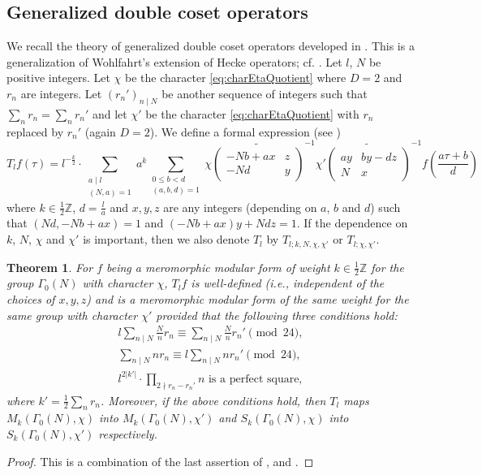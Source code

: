 \documentclass[12pt]{amsart}
\numberwithin{equation}{section}
\theoremstyle{plain}
\newtheorem{thm}{Theorem}[section]
\theoremstyle{definition}
\theoremstyle{remark}
\newcommand\twoscript[2]{\substack{{#1} \\ {#2}}}
\newcommand\tbtmat[4]{\left(\begin{smallmatrix}{#1} & {#2} \\ {#3} & {#4}\end{smallmatrix}\right)}
\newcommand*\abs[1]{\lvert#1\rvert}
\newcommand\numZ{\mathbb{Z}}
\begin{document}
\subsection{Generalized double coset operators}
We recall the theory of generalized double coset operators developed in \cite[Section 3]{ZZ23}. This is a generalization of Wohlfahrt's extension of Hecke operators; cf. \cite{Woh57}. Let $l$, $N$ be positive integers. Let $\chi$ be the character \eqref{eq:charEtaQuotient} where $D=2$ and $r_n$ are integers. Let $(r_n')_{n\mid N}$ be another sequence of integers such that $\sum_nr_n=\sum_nr_n'$ and let $\chi'$ be the character \eqref{eq:charEtaQuotient} with $r_n$ replaced by $r_n'$ (again $D=2$). We define a formal expression (see \cite[Eq. (28) and (30)]{ZZ23})
\begin{equation}
\label{eq:Tlf}
T_lf(\tau)=l^{-\frac{k}{2}}\cdot\sum_{\twoscript{a\mid l}{(N,a)=1}}a^k\sum_{\twoscript{0\leq b<d}{(a,b,d)=1}}\chi\widetilde{\tbtmat{-Nb+ax}{z}{-Nd}{y}}^{-1}\chi'\widetilde{\tbtmat{ay}{by-dz}{N}{x}}^{-1}f\left(\frac{a\tau+b}{d}\right)
\end{equation}
where $k\in\frac{1}{2}\numZ$, $d=\frac{l}{a}$ and $x,y,z$ are any integers (depending on $a$, $b$ and $d$) such that $(Nd,-Nb+ax)=1$ and $(-Nb+ax)y+Ndz=1$. If the dependence on $k$, $N$, $\chi$ and $\chi'$ is important, then we also denote $T_l$ by $T_{l;k,N,\chi,\chi'}$ or $T_{l;\chi,\chi'}$.
\begin{thm}
\label{thm:doubleCosetOperator}
For $f$ being a meromorphic modular form of weight $k\in\frac{1}{2}\numZ$ for the group $\Gamma_0(N)$ with character $\chi$, $T_lf$ is well-defined (i.e., independent of the choices of $x,y,z$) and is a meromorphic modular form of the same weight for the same group with character $\chi'$ provided that the following three conditions hold:
\begin{gather} 
l\sum_{n \mid N}\frac{N}{n}r_n \equiv \sum_{n \mid N}\frac{N}{n}r_n' \pmod{24},\label{eq:charCom1}\\
\sum_{n \mid N}nr_n \equiv l\sum_{n \mid N}nr_n' \pmod{24},\label{eq:charCom2}\\
l^{2\abs{k'}}\cdot\prod_{2 \nmid r_n-r_n'}n \text{ is a perfect square,}\label{eq:charCom3}
\end{gather}
where $k'=\frac{1}{2}\sum_nr_n$. Moreover, if the above conditions hold, then $T_l$ maps $M_k(\Gamma_0(N),\chi)$ into $M_k(\Gamma_0(N),\chi')$ and $S_k(\Gamma_0(N),\chi)$ into $S_k(\Gamma_0(N),\chi')$ respectively.
\end{thm}
\begin{proof}
This is a combination of the last assertion of \cite[Theorem 3.9]{ZZ23}, \cite[Proposition 3.2(4),(5)]{ZZ23} and \cite[Eq. (28), (30)]{ZZ23}.
\end{proof}
\end{document}
